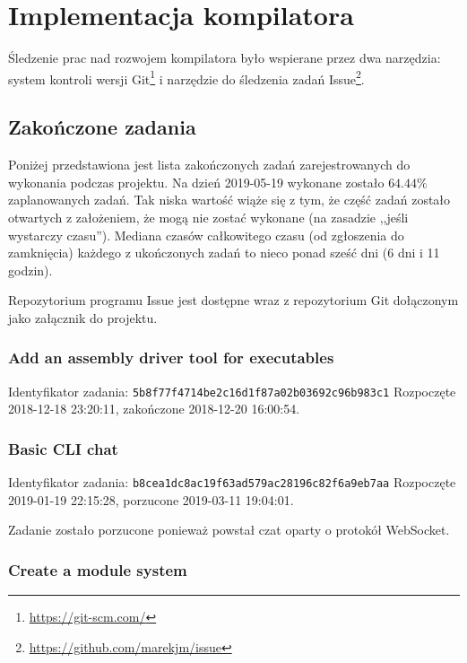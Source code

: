 \section{Implementacja kompilatora}

Śledzenie prac nad rozwojem kompilatora było wspierane przez dwa narzędzia:
system kontroli wersji Git\footnote{\url{https://git-scm.com/}} i narzędzie do
śledzenia zadań Issue\footnote{\url{https://github.com/marekjm/issue}}.

\subsection{Zakończone zadania}

Poniżej przedstawiona jest lista zakończonych zadań zarejestrowanych do
wykonania podczas projektu.
Na dzień 2019-05-19 wykonane zostało $64.44\%$ zaplanowanych zadań. Tak niska
wartość wiąże się z tym, że część zadań zostało otwartych z założeniem, że mogą
nie zostać wykonane (na zasadzie ,,jeśli wystarczy czasu''). Mediana czasów
całkowitego czasu (od zgłoszenia do zamknięcia) każdego z ukończonych zadań to
nieco ponad sześć dni (6 dni i 11 godzin).

Repozytorium programu Issue jest dostępne wraz z repozytorium Git dołączonym
jako załącznik do projektu.

\subsubsection{Add an assembly driver tool for executables}

Identyfikator zadania: \texttt{5b8f77f4714be2c16d1f87a02b03692c96b983c1}
\newline
Rozpoczęte 2018-12-18 23:20:11, zakończone 2018-12-20 16:00:54.

\subsubsection{Basic CLI chat}

Identyfikator zadania: \texttt{b8cea1dc8ac19f63ad579ac28196c82f6a9eb7aa}
\newline
Rozpoczęte 2019-01-19 22:15:28, porzucone 2019-03-11 19:04:01.
\newline

Zadanie zostało porzucone ponieważ powstał czat oparty o protokół WebSocket.

\subsubsection{Create a module system}

